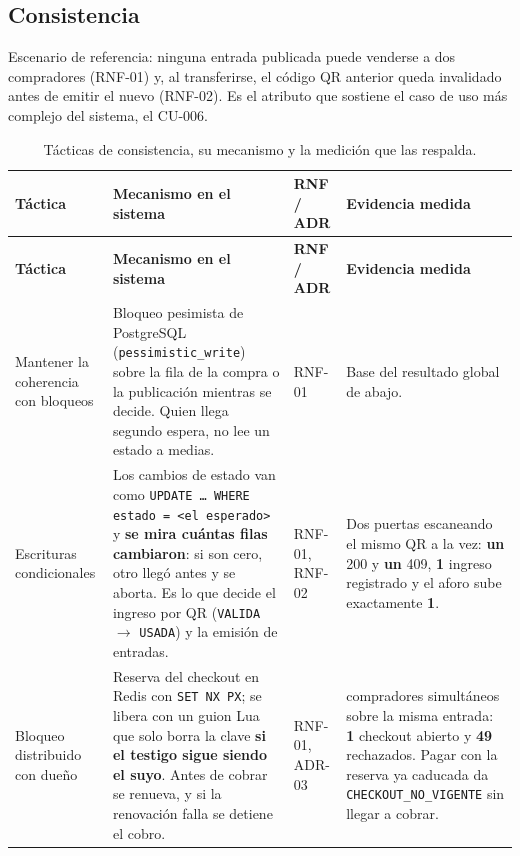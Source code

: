 \documentclass[11pt,a4paper]{article}
\begin{document}
\subsection{Consistencia}

Escenario de referencia: ninguna entrada publicada puede venderse a dos compradores (RNF-01) y,
al transferirse, el código QR anterior queda invalidado antes de emitir el nuevo (RNF-02). Es el
atributo que sostiene el caso de uso más complejo del sistema, el CU-006.

\begin{center}
\begin{longtable}{|>{\raggedright\arraybackslash}p{2.9cm}|>{\raggedright\arraybackslash}p{5.1cm}|>{\raggedright\arraybackslash}p{1.7cm}|>{\raggedright\arraybackslash}p{3.7cm}|}
\caption{Tácticas de consistencia, su mecanismo y la medición que las respalda.}\label{tab:tacticas-consistencia}\\
\hline
\textbf{Táctica} & \textbf{Mecanismo en el sistema} & \textbf{RNF / ADR} & \textbf{Evidencia medida}\\
\hline
\endfirsthead
\hline
\textbf{Táctica} & \textbf{Mecanismo en el sistema} & \textbf{RNF / ADR} & \textbf{Evidencia medida}\\
\hline
\endhead

Mantener la coherencia con bloqueos &
Bloqueo pesimista de PostgreSQL (\texttt{pessimistic\_write}) sobre la fila de la compra o la
publicación mientras se decide. Quien llega segundo espera, no lee un estado a medias. &
RNF-01 &
Base del resultado global de abajo.\\
\hline

Escrituras condicionales &
Los cambios de estado van como \texttt{UPDATE \dots{} WHERE estado = <el esperado>} y \textbf{se
mira cuántas filas cambiaron}: si son cero, otro llegó antes y se aborta. Es lo que decide el
ingreso por QR (\texttt{VALIDA} $\rightarrow$ \texttt{USADA}) y la emisión de entradas. &
RNF-01, RNF-02 &
Dos puertas escaneando el mismo QR a la vez: \textbf{un} 200 y \textbf{un} 409, \textbf{1} ingreso
registrado y el aforo sube exactamente \textbf{1}.\\
\hline

Bloqueo distribuido con dueño &
Reserva del checkout en Redis con \texttt{SET NX PX}; se libera con un guion Lua que solo borra la
clave \textbf{si el testigo sigue siendo el suyo}. Antes de cobrar se renueva, y si la renovación
falla se detiene el cobro. &
RNF-01, ADR-03 &
50 compradores simultáneos sobre la misma entrada: \textbf{1} checkout abierto y \textbf{49}
rechazados. Pagar con la reserva ya caducada da \texttt{CHECKOUT\_NO\_VIGENTE} sin llegar a
cobrar.\\
\hline


\end{longtable}
\end{center}
\end{document}
